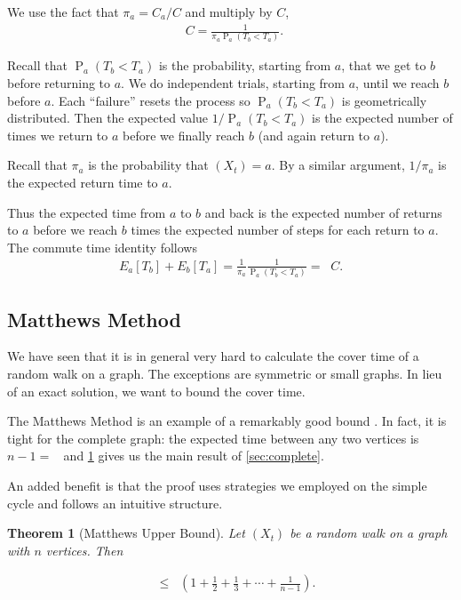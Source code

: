 \documentclass[12pt]{article}
\newtheorem{theorem}{Theorem}
\theoremstyle{definition}
\DeclareMathOperator{\pr}{\mathrm{P}}		     %
\DeclareMathOperator{\tcov}{t_\textrm{cov}}      %
\DeclareMathOperator{\hit}{t_{\textrm{hit}}}     %
\DeclareMathOperator{\Reff}{R_{\textrm{eff}}}    %
\begin{document}
We use the fact that $\pi_a = C_a / C$ and multiply by $C$,
\begin{align}
\Reff C = \frac{1}{\pi_a \pr_a(T_b < T_a)}. \nonumber
\end{align}

Recall that $\pr_a(T_b < T_a)$ is the probability, starting from $a$,
that we get to $b$ before returning to $a$.
We do independent trials, starting from $a$, until we reach $b$ before $a$.
Each ``failure'' resets the process so $\pr_a(T_b < T_a)$ is geometrically distributed.
Then the expected value $1/\pr_a(T_b < T_a)$ is the expected number of times
we return to $a$ before we finally reach $b$ (and again return to $a$).

Recall that $\pi_a$ is the probability that $(X_t) = a$.
By a similar argument, $1/\pi_a$ is the expected return time to $a$.

Thus the expected time from $a$ to $b$ and back is
the expected number of returns to $a$ before we reach $b$ times
the expected number of steps for each return to $a$.
The commute time identity follows
\begin{align}
E_a[T_b] + E_b[T_a] = \frac{1}{\pi_a}\frac{1}{\pr_a(T_b < T_a)} = \Reff C.
\label{eqn:commute}
\end{align}

\subsection{Matthews Method}\label{sec:matthews}
We have seen that it is in general very hard
to calculate the cover time of a random walk
on a graph.
The exceptions are symmetric or small graphs.
In lieu of an exact solution, we want to 
bound the cover time.

The Matthews Method is an example of a remarkably good bound \cite{LP17}.
In fact, it is tight for the complete graph:
the expected time between any two vertices
is $n-1 = \hit$ and \cref{thm:matthews_up} gives
us the main result of \cref{sec:complete}.

An added benefit is that the proof uses strategies we employed on the
simple cycle and follows an intuitive structure.

\begin{theorem}[Matthews Upper Bound]
Let $(X_t)$ be a random walk on a graph with $n$ vertices. Then \label{thm:matthews_up}
\end{theorem}
\begin{align}
\tcov &\leq \hit \left(1 + \frac{1}{2} + \frac{1}{3} + \cdots + \frac{1}{n-1} \right). \nonumber
\end{align}
\end{document}
